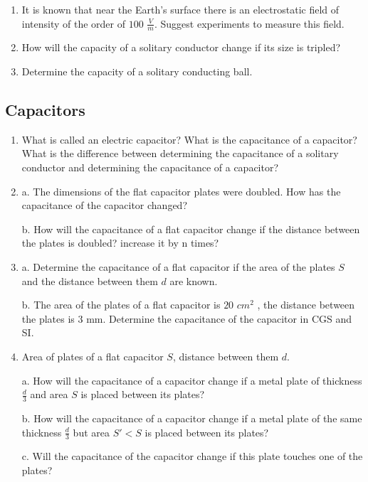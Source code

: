 \documentclass{article}
\begin{document}
\begin{enumerate}[label=6.3.\arabic*]
\item It is known that near the Earth's surface there is an electrostatic field of intensity of the order of $100$ $\frac{V}{m}$. Suggest experiments to measure this field.

\item How will the capacity of a solitary conductor change if its size is tripled?

\item Determine the capacity of a solitary conducting ball.


\end{enumerate}
\subsection{Capacitors}
\begin{enumerate}[label=6.4.\arabic*]

\item What is called an electric capacitor? What is the capacitance of a capacitor? What is the difference between determining the capacitance of a solitary conductor and determining the capacitance of a capacitor?

\item a. The dimensions of the flat capacitor plates were doubled. How has the capacitance of the capacitor changed? 

b. How will the capacitance of a flat capacitor change if the distance between the plates is doubled? increase it by n times?

\item a. Determine the capacitance of a flat capacitor if the area of the plates $S$ and the distance between them $d$ are known. 

b. The area of the plates of a flat capacitor is $20$ $cm^2$ , the distance between the plates is $3$ mm. Determine the capacitance of the capacitor in CGS and SI.

\item Area of plates of a flat capacitor $S$, distance between them $d$. 

a. How will the capacitance of a capacitor change if a metal plate of thickness $\frac{d}{3}$ and area $S$ is placed between its plates? 

b. How will the capacitance of a capacitor change if a metal plate of the same thickness $\frac{d}{3}$ but area $S' < S$ is placed between its plates? 

c. Will the capacitance of the capacitor change if this plate touches one of the plates?


\end{enumerate}
\end{document}
